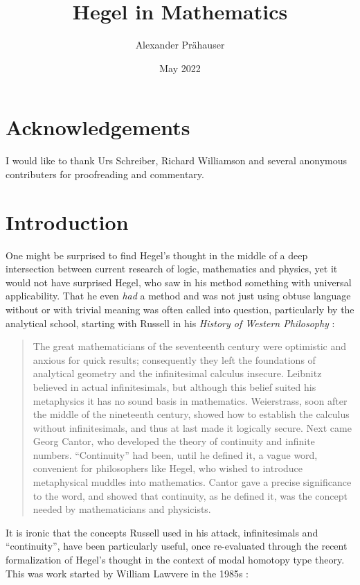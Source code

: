 \documentclass{article}
\title{Hegel in Mathematics}
\author{Alexander Prähauser}
\date{May 2022}
\begin{document}
\maketitle

\tableofcontents

\section{Acknowledgements}
I would like to thank Urs Schreiber, Richard Williamson and several anonymous contributers for proofreading and commentary.

\section{Introduction}
One might be surprised to find Hegel's thought in the middle of a deep intersection between current research
of logic, mathematics and physics, yet it would not have surprised Hegel, who saw in his method something
with universal applicability. That he even \emph{had} a method and was not just using obtuse language
without or with trivial meaning was often called into question, particularly by the analytical school,
starting with Russell in his \emph{History of Western Philosophy} \cite{Russ}:

\begin{quote}
    The great mathematicians of the seventeenth century were optimistic and anxious for quick results;
consequently they left the foundations of analytical geometry and the infinitesimal calculus insecure.
Leibnitz believed in actual infinitesimals, but although this belief suited his metaphysics it has no
sound basis in mathematics. Weierstrass, soon after the middle of the nineteenth century, showed how to
establish the calculus without infinitesimals, and thus at last made it logically secure. Next came Georg
Cantor, who developed the theory of continuity and infinite numbers. ``Continuity'' had been, until he
defined it, a vague word, convenient for philosophers like Hegel, who wished to introduce metaphysical
muddles into mathematics. Cantor gave a precise significance to the word, and showed that continuity,
as he defined it, was the concept needed by mathematicians and physicists.
\end{quote}

It is ironic that the concepts Russell used in his attack, infinitesimals and ``continuity'', have been
particularly useful, once re-evaluated through the recent formalization of Hegel's thought in the context
of modal homotopy type theory. This was work started by William Lawvere in the 1985s \cite{Law96}:
\end{document}
